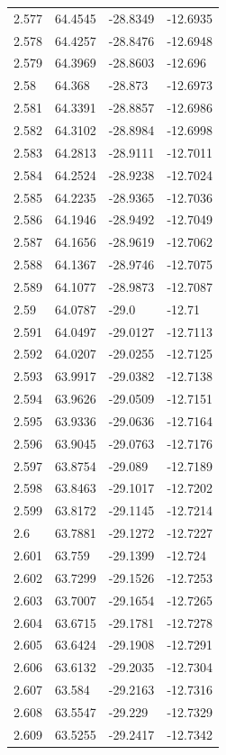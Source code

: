 \begin{tabular}{llll}
2.577 & 64.4545 & -28.8349 & -12.6935 \\
2.578 & 64.4257 & -28.8476 & -12.6948 \\
2.579 & 64.3969 & -28.8603 & -12.696 \\
2.58 & 64.368 & -28.873 & -12.6973 \\
2.581 & 64.3391 & -28.8857 & -12.6986 \\
2.582 & 64.3102 & -28.8984 & -12.6998 \\
2.583 & 64.2813 & -28.9111 & -12.7011 \\
2.584 & 64.2524 & -28.9238 & -12.7024 \\
2.585 & 64.2235 & -28.9365 & -12.7036 \\
2.586 & 64.1946 & -28.9492 & -12.7049 \\
2.587 & 64.1656 & -28.9619 & -12.7062 \\
2.588 & 64.1367 & -28.9746 & -12.7075 \\
2.589 & 64.1077 & -28.9873 & -12.7087 \\
2.59 & 64.0787 & -29.0 & -12.71 \\
2.591 & 64.0497 & -29.0127 & -12.7113 \\
2.592 & 64.0207 & -29.0255 & -12.7125 \\
2.593 & 63.9917 & -29.0382 & -12.7138 \\
2.594 & 63.9626 & -29.0509 & -12.7151 \\
2.595 & 63.9336 & -29.0636 & -12.7164 \\
2.596 & 63.9045 & -29.0763 & -12.7176 \\
2.597 & 63.8754 & -29.089 & -12.7189 \\
2.598 & 63.8463 & -29.1017 & -12.7202 \\
2.599 & 63.8172 & -29.1145 & -12.7214 \\
2.6 & 63.7881 & -29.1272 & -12.7227 \\
2.601 & 63.759 & -29.1399 & -12.724 \\
2.602 & 63.7299 & -29.1526 & -12.7253 \\
2.603 & 63.7007 & -29.1654 & -12.7265 \\
2.604 & 63.6715 & -29.1781 & -12.7278 \\
2.605 & 63.6424 & -29.1908 & -12.7291 \\
2.606 & 63.6132 & -29.2035 & -12.7304 \\
2.607 & 63.584 & -29.2163 & -12.7316 \\
2.608 & 63.5547 & -29.229 & -12.7329 \\
2.609 & 63.5255 & -29.2417 & -12.7342 \\

\end{tabular}
